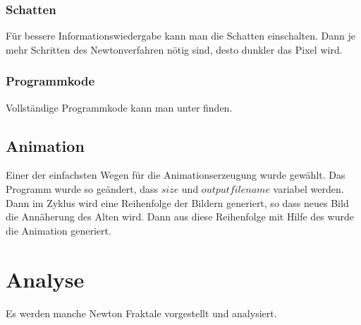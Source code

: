 \documentclass[a4paper,12pt]{llncs}
\numberwithin{equation}{section}
\begin{document}
\subsubsection{Schatten}
Für bessere Informationswiedergabe kann man die Schatten einschalten.
Dann je mehr Schritten des Newtonverfahren nötig sind, desto dunkler das Pixel wird.  
\subsubsection{Programmkode}
Vollständige Programmkode kann man unter \cite{source} finden.
\subsection{Animation}\label{subs:vis:anime}
Einer der einfachsten Wegen für die Animationserzeugung wurde gewählt. 
Das Programm wurde so geändert, dass $size$ und $outputfilename$ variabel werden. 
Dann im Zyklus wird eine Reihenfolge der Bildern generiert, so dass neues Bild die Annäherung des Alten wird.
Dann aus diese Reihenfolge mit Hilfe des \cite{animegen} wurde die Animation generiert.
\section{Analyse}\label{sec:analy}
Es werden manche Newton Fraktale vorgestellt und analysiert.
\end{document}
